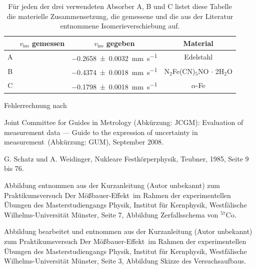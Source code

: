 \documentclass[
a4paper,                %
titlepage=firstiscover, %
captions=tableheading,  %
toc=bibliography,       %
toc=listof,             %
oneside,                %
automark,               %
12pt,                   %
english, ngerman,       %
parskip = half,         %
]{scrartcl}
\begin{document}
\begin{table}[H]
	\centering
	\caption{Für jeden der drei verwendeten Absorber A, B und C listet diese Tabelle die materielle Zusammensetzung, die gemessene und die aus der Literatur entnommene Isomerieverschiebung auf.} 
	\label{tab:isoVgl}
	\begin{tabular}{c|ccc}
		\toprule
		&   $v_\text{iso}$ gemessen    &            $v_\text{iso}$ gegeben             &           Material            \\ \midrule
		A &  & \SI{-0,2658+-0,0032}{\milli\meter\per\second} &             Edelstahl             \\
		B &  & \SI{-0,4374+-0,0018}{\milli\meter\per\second} & N$_2$Fe(CN)$_5$NO $\cdot$ 2H$_2$O \\
		C &  & \SI{-0,1798+-0,0018}{\milli\meter\per\second} &             $\alpha$-Fe              \\ \bottomrule
	\end{tabular}
\end{table}


\newpage


\begin{thebibliography}{9}
	
	 Fehlerrechnung nach
	
	Joint Committee for Guides in Metrology (Abkürzung: JCGM): \glqq Evaluation of measurement data — Guide to the expression of uncertainty in measurement\grqq\ (Abkürzung: GUM), September 2008.
	
	 G. Schatz und A. Weidinger, \glqq Nukleare Festkörperphysik\grqq , Teubner, 1985, Seite 9 bis 76.
	
	 Abbildung entnommen aus der Kurzanleitung (Autor unbekannt) zum Praktikumsversuch \glqq Der Mößbauer-Effekt\grqq\ im Rahmen der experimentellen Übungen des Masterstudiengangs Physik, Institut für Kernphysik, Westfälische Wilhelms-Universität Münster, Seite 7, Abbildung \glqq Zerfallsschema von $^{57}$Co\grqq .
	
	 Abbildung bearbeitet und entnommen aus der Kurzanleitung (Autor unbekannt) zum Praktikumsversuch \glqq Der Mößbauer-Effekt\grqq\ im Rahmen der experimentellen Übungen des Masterstudiengangs Physik, Institut für Kernphysik, Westfälische Wilhelms-Universität Münster, Seite 3, Abbildung \glqq Skizze des Versuchsaufbaus\grqq .
	
\end{thebibliography}
\end{document}

